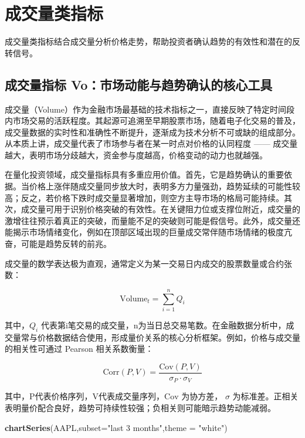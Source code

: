 \documentclass[]{ctexbook}
\newenvironment{Shaded}{\begin{snugshade}}{\end{snugshade}}
\newcommand{\AttributeTok}[1]{\textcolor[rgb]{0.13,0.29,0.53}{#1}}
\newcommand{\FunctionTok}[1]{\textcolor[rgb]{0.13,0.29,0.53}{\textbf{#1}}}
\newcommand{\NormalTok}[1]{#1}
\newcommand{\StringTok}[1]{\textcolor[rgb]{0.31,0.60,0.02}{#1}}
\begin{document}
\section{成交量类指标}\label{ux6210ux4ea4ux91cfux7c7bux6307ux6807}

成交量类指标结合成交量分析价格走势，帮助投资者确认趋势的有效性和潜在的反转信号。

\subsection{成交量指标 Vo：市场动能与趋势确认的核心工具}\label{ux6210ux4ea4ux91cfux6307ux6807-voux5e02ux573aux52a8ux80fdux4e0eux8d8bux52bfux786eux8ba4ux7684ux6838ux5fc3ux5de5ux5177}

成交量（Volume）作为金融市场最基础的技术指标之一，直接反映了特定时间段内市场交易的活跃程度。其起源可追溯至早期股票市场，随着电子化交易的普及，成交量数据的实时性和准确性不断提升，逐渐成为技术分析不可或缺的组成部分。从本质上讲，成交量代表了市场参与者在某一时点对价格的认同程度 ------ 成交量越大，表明市场分歧越大，资金参与度越高，价格变动的动力也就越强。

在量化投资领域，成交量指标具有多重应用价值。首先，它是趋势确认的重要依据。当价格上涨伴随成交量同步放大时，表明多方力量强劲，趋势延续的可能性较高；反之，若价格下跌时成交量显著增加，则空方主导市场的格局可能持续。其次，成交量可用于识别价格突破的有效性。在关键阻力位或支撑位附近，成交量的激增往往预示着真正的突破，而量能不足的突破则可能是假信号。此外，成交量还能揭示市场情绪变化，例如在顶部区域出现的巨量成交常伴随市场情绪的极度亢奋，可能是趋势反转的前兆。

成交量的数学表达极为直观，通常定义为某一交易日内成交的股票数量或合约张数：

\[\text{Volume}_t = \sum_{i=1}^{n}Q_i\]

其中，\(Q_i\) 代表第i笔交易的成交量，n为当日总交易笔数。在金融数据分析中，成交量常与价格数据结合使用，形成量价关系的核心分析框架。例如，价格与成交量的相关性可通过 Pearson 相关系数衡量：

\[\text{Corr}(P, V) = \frac{\text{Cov}(P, V)}{\sigma_P \cdot \sigma_V}\]

其中，P代表价格序列，V代表成交量序列，\(\text{Cov}\) 为协方差， \(\sigma\) 为标准差。正相关表明量价配合良好，趋势可持续性较强；负相关则可能暗示趋势动能减弱。

\begin{Shaded}
\begin{Highlighting}[]
\FunctionTok{chartSeries}\NormalTok{(AAPL,}\AttributeTok{subset=}\StringTok{"last 3 months"}\NormalTok{,}\AttributeTok{theme =} \StringTok{"white"}\NormalTok{)}
\end{Highlighting}
\end{Shaded}
\end{document}
